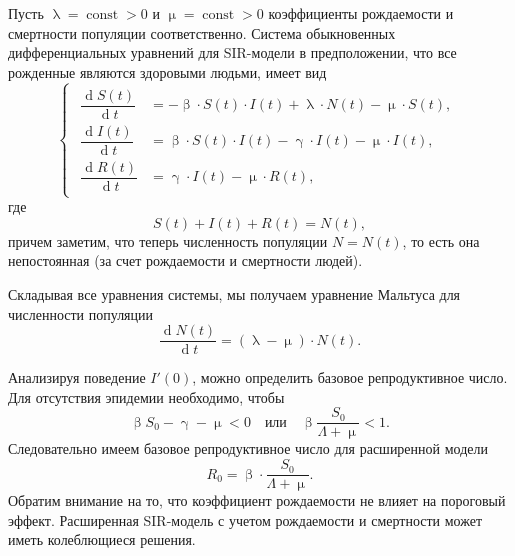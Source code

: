 \documentclass[a4paper, 12pt]{extarticle}
\numberwithin{equation}{section}
\renewcommand{\beta}{\upbeta}
\renewcommand{\gamma}{\upgamma}
\renewcommand{\lambda}{\uplambda}
\renewcommand{\mu}{\upmu}
\renewcommand{\d}{\operatorname{d}}
\begin{document}
	Пусть $\lambda = \operatorname{const} > 0$ и $\mu = \operatorname{const} > 0$ коэффициенты рождаемости и смертности популяции соответственно. Система обыкновенных дифференциальных уравнений для SIR-модели в предположении, что все рожденные являются здоровыми людьми, имеет вид 
	\begin{equation}
		\left\{ 
		\begin{gathered} 
			\begin{aligned}
				\dfrac {\d S(t)}{\d t} &= -\beta \cdot S(t) \cdot I(t) + \lambda\cdot N(t) - \mu\cdot S(t),\\
				\dfrac{\d I(t)}{\d t} &= \beta \cdot S(t)\cdot I(t) - \gamma\cdot I(t) - \mu\cdot I(t),\\
				\dfrac{\d R(t)}{\d t} &= \gamma\cdot I(t) - \mu \cdot R(t),
			\end{aligned}
		\end{gathered} 
		\right.
	\end{equation}
	где $$S(t) + I(t) + R(t) = N(t),$$ причем заметим, что теперь численность популяции $N = N(t)$, то есть она непостоянная (за счет рождаемости и смертности людей).
	
	Складывая все уравнения системы, мы получаем уравнение Мальтуса для численности популяции 
	\begin{equation}
	\dfrac{\d N(t)}{\d t} = (\lambda-\mu) \cdot N(t).
	\end{equation}
	
	Анализируя поведение $I'(0)$, можно определить базовое репродуктивное число. Для отсутствия эпидемии необходимо, чтобы $$\beta S_0 - \gamma - \mu < 0 \quad \text{или}\quad \beta \dfrac{S_0}{\Lambda+\mu} < 1.$$
	Следовательно имеем базовое репродуктивное число для расширенной модели $$R_0 = \beta \cdot \dfrac{S_0}{\Lambda+\mu}.$$ Обратим внимание на то, что коэффициент рождаемости не влияет на пороговый
	эффект. Расширенная SIR-модель с учетом рождаемости и смертности может иметь колеблющиеся решения.
	
\end{document}
